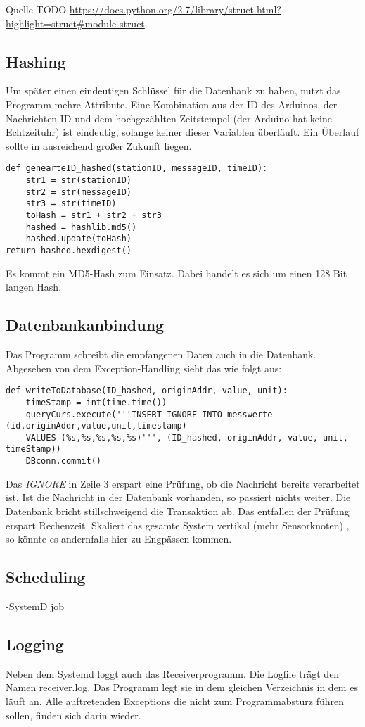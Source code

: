 Quelle TODO \url{https://docs.python.org/2.7/library/struct.html?highlight=struct#module-struct}



\subsection{Hashing}
Um später einen eindeutigen Schlüssel für die Datenbank zu haben, nutzt das Programm mehre Attribute. Eine Kombination aus der ID des Arduinos, der Nachrichten-ID und dem hochgezählten Zeitstempel (der Arduino hat keine Echtzeituhr) ist eindeutig, solange keiner dieser Variablen überläuft. Ein Überlauf sollte in ausreichend großer Zukunft liegen. 

\lstset{language=python, numbers=none, breaklines=true}
\begin{lstlisting}
def genearteID_hashed(stationID, messageID, timeID):
    str1 = str(stationID)
    str2 = str(messageID)
    str3 = str(timeID)
    toHash = str1 + str2 + str3
    hashed = hashlib.md5()
    hashed.update(toHash)
return hashed.hexdigest()
\end{lstlisting}
Es kommt ein MD5-Hash zum Einsatz. Dabei handelt es sich um einen 128 Bit langen Hash. 


\subsection{Datenbankanbindung}
Das Programm schreibt die empfangenen Daten auch in die Datenbank. Abgesehen von dem Exception-Handling sieht das wie folgt aus: 

\lstset{language=python, numbers=left, breaklines=true}
\begin{lstlisting}
def writeToDatabase(ID_hashed, originAddr, value, unit):
    timeStamp = int(time.time())
    queryCurs.execute('''INSERT IGNORE INTO messwerte (id,originAddr,value,unit,timestamp)
	VALUES (%s,%s,%s,%s,%s)''', (ID_hashed, originAddr, value, unit, timeStamp))
	DBconn.commit()
\end{lstlisting}
Das \textit{IGNORE} in Zeile 3 erspart eine Prüfung, ob die Nachricht bereits verarbeitet ist. Ist die Nachricht in der Datenbank vorhanden, so passiert nichts weiter. Die Datenbank bricht stillschweigend die Transaktion ab. Das entfallen der Prüfung erspart Rechenzeit. Skaliert das gesamte System vertikal (mehr Sensorknoten) , so könnte es andernfalls hier zu Engpässen kommen.   

\subsection{Scheduling}
-SystemD job
\subsection{Logging}
Neben dem Systemd loggt auch das Receiverprogramm. Die Logfile trägt den Namen receiver.log. Das Programm legt sie in dem gleichen Verzeichnis in dem es läuft an. Alle auftretenden Exceptions die nicht zum Programmabsturz führen sollen, finden sich darin wieder.
